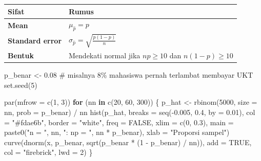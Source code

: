 \documentclass[
  indonesian,
  letterpaper,
]{book}
\newenvironment{Shaded}{\begin{snugshade}}{\end{snugshade}}
\newcommand{\AttributeTok}[1]{\textcolor[rgb]{0.40,0.45,0.13}{#1}}
\newcommand{\CommentTok}[1]{\textcolor[rgb]{0.37,0.37,0.37}{#1}}
\newcommand{\ConstantTok}[1]{\textcolor[rgb]{0.56,0.35,0.01}{#1}}
\newcommand{\ControlFlowTok}[1]{\textcolor[rgb]{0.00,0.23,0.31}{\textbf{#1}}}
\newcommand{\DecValTok}[1]{\textcolor[rgb]{0.68,0.00,0.00}{#1}}
\newcommand{\FloatTok}[1]{\textcolor[rgb]{0.68,0.00,0.00}{#1}}
\newcommand{\FunctionTok}[1]{\textcolor[rgb]{0.28,0.35,0.67}{#1}}
\newcommand{\NormalTok}[1]{\textcolor[rgb]{0.00,0.23,0.31}{#1}}
\newcommand{\OtherTok}[1]{\textcolor[rgb]{0.00,0.23,0.31}{#1}}
\newcommand{\SpecialCharTok}[1]{\textcolor[rgb]{0.37,0.37,0.37}{#1}}
\newcommand{\StringTok}[1]{\textcolor[rgb]{0.13,0.47,0.30}{#1}}
\newcounter{none} %
\begin{document}
{\def\LTcaptype{none} %
\begin{longtable}[]{@{}ll@{}}
\toprule\noalign{}
Sifat & Rumus \\
\midrule\noalign{}
\endhead
\bottomrule\noalign{}
\endlastfoot
\textbf{Mean} & \(\mu_{\hat{p}} = p\) \\
\textbf{Standard error} &
\(\sigma_{\hat{p}} = \sqrt{\frac{p(1 - p)}{n}}\) \\
\textbf{Bentuk} & Mendekati normal jika \(np \ge 10\) dan
\(n(1 - p) \ge 10\) \\
\end{longtable}
}

\begin{Shaded}
\begin{Highlighting}[]
\NormalTok{p\_benar }\OtherTok{\textless{}{-}} \FloatTok{0.08} \CommentTok{\# misalnya 8\% mahasiswa pernah terlambat membayar UKT}
\FunctionTok{set.seed}\NormalTok{(}\DecValTok{5}\NormalTok{)}

\FunctionTok{par}\NormalTok{(}\AttributeTok{mfrow =} \FunctionTok{c}\NormalTok{(}\DecValTok{1}\NormalTok{, }\DecValTok{3}\NormalTok{))}
\ControlFlowTok{for}\NormalTok{ (nn }\ControlFlowTok{in} \FunctionTok{c}\NormalTok{(}\DecValTok{20}\NormalTok{, }\DecValTok{60}\NormalTok{, }\DecValTok{300}\NormalTok{)) \{}
\NormalTok{  p\_hat }\OtherTok{\textless{}{-}} \FunctionTok{rbinom}\NormalTok{(}\DecValTok{5000}\NormalTok{, }\AttributeTok{size =}\NormalTok{ nn, }\AttributeTok{prob =}\NormalTok{ p\_benar) }\SpecialCharTok{/}\NormalTok{ nn}
  \FunctionTok{hist}\NormalTok{(p\_hat, }\AttributeTok{breaks =} \FunctionTok{seq}\NormalTok{(}\SpecialCharTok{{-}}\FloatTok{0.005}\NormalTok{, }\FloatTok{0.4}\NormalTok{, }\AttributeTok{by =} \FloatTok{0.01}\NormalTok{), }\AttributeTok{col =} \StringTok{"\#fdae6b"}\NormalTok{,}
       \AttributeTok{border =} \StringTok{"white"}\NormalTok{, }\AttributeTok{freq =} \ConstantTok{FALSE}\NormalTok{, }\AttributeTok{xlim =} \FunctionTok{c}\NormalTok{(}\DecValTok{0}\NormalTok{, }\FloatTok{0.3}\NormalTok{),}
       \AttributeTok{main =} \FunctionTok{paste0}\NormalTok{(}\StringTok{"n = "}\NormalTok{, nn, }\StringTok{": np = "}\NormalTok{, nn }\SpecialCharTok{*}\NormalTok{ p\_benar),}
       \AttributeTok{xlab =} \StringTok{"Proporsi sampel"}\NormalTok{)}
  \FunctionTok{curve}\NormalTok{(}\FunctionTok{dnorm}\NormalTok{(x, p\_benar, }\FunctionTok{sqrt}\NormalTok{(p\_benar }\SpecialCharTok{*}\NormalTok{ (}\DecValTok{1} \SpecialCharTok{{-}}\NormalTok{ p\_benar) }\SpecialCharTok{/}\NormalTok{ nn)),}
        \AttributeTok{add =} \ConstantTok{TRUE}\NormalTok{, }\AttributeTok{col =} \StringTok{"firebrick"}\NormalTok{, }\AttributeTok{lwd =} \DecValTok{2}\NormalTok{)}
\NormalTok{\}}
\end{Highlighting}
\end{Shaded}
\end{document}
